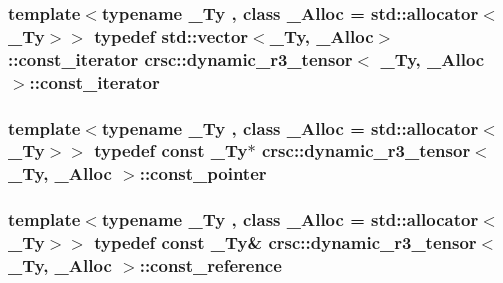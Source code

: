 \subsubsection[{\texorpdfstring{const\+\_\+iterator}{const_iterator}}]{\setlength{\rightskip}{0pt plus 5cm}template$<$typename \+\_\+\+Ty , class \+\_\+\+Alloc  = std\+::allocator$<$\+\_\+\+Ty$>$$>$ typedef std\+::vector$<$\+\_\+\+Ty, \+\_\+\+Alloc$>$\+::{\bf const\+\_\+iterator} {\bf crsc\+::dynamic\+\_\+r3\+\_\+tensor}$<$ \+\_\+\+Ty, \+\_\+\+Alloc $>$\+::{\bf const\+\_\+iterator}}\hypertarget{classcrsc_1_1dynamic__r3__tensor_a8e4bf09063232b58e5ae3b1a135fdff5}{}\label{classcrsc_1_1dynamic__r3__tensor_a8e4bf09063232b58e5ae3b1a135fdff5}
\subsubsection[{\texorpdfstring{const\+\_\+pointer}{const_pointer}}]{\setlength{\rightskip}{0pt plus 5cm}template$<$typename \+\_\+\+Ty , class \+\_\+\+Alloc  = std\+::allocator$<$\+\_\+\+Ty$>$$>$ typedef const \+\_\+\+Ty$\ast$ {\bf crsc\+::dynamic\+\_\+r3\+\_\+tensor}$<$ \+\_\+\+Ty, \+\_\+\+Alloc $>$\+::{\bf const\+\_\+pointer}}\hypertarget{classcrsc_1_1dynamic__r3__tensor_afb88e84aba287b3b787b6d031c2c862e}{}\label{classcrsc_1_1dynamic__r3__tensor_afb88e84aba287b3b787b6d031c2c862e}
\subsubsection[{\texorpdfstring{const\+\_\+reference}{const_reference}}]{\setlength{\rightskip}{0pt plus 5cm}template$<$typename \+\_\+\+Ty , class \+\_\+\+Alloc  = std\+::allocator$<$\+\_\+\+Ty$>$$>$ typedef const \+\_\+\+Ty\& {\bf crsc\+::dynamic\+\_\+r3\+\_\+tensor}$<$ \+\_\+\+Ty, \+\_\+\+Alloc $>$\+::{\bf const\+\_\+reference}}\hypertarget{classcrsc_1_1dynamic__r3__tensor_a5dd99c21cd4dc396a2ae225f90301cdc}{}\label{classcrsc_1_1dynamic__r3__tensor_a5dd99c21cd4dc396a2ae225f90301cdc}
